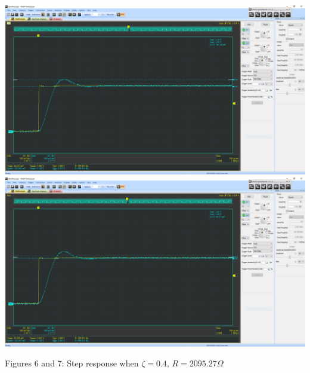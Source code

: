 \documentclass[12pt]{article}
\newcommand{\objects}[2]{%
  \leavevmode\vbox{\hbox{#1}\nointerlineskip\hbox{#2}}%
}
\begin{document}
    \begin{center}
        \objects
            {\includegraphics[width=\textwidth]{4.4 (0.4) 1.png}}
            {\includegraphics[width=\textwidth]{4.4 (0.4) 2.png}}
    \end{center}
    \begin{center}
        Figures 6 and 7: Step response when $ \zeta = 0.4 $, $ R = 2095.27 \Omega $
    \end{center}
    \newpage
\end{document}
